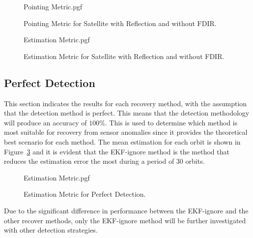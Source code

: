 \documentclass[letterpaper, 10 pt, conference]{ieeeconf}  %
\begin{document}
\begin{figure}[!htb]
	\begin{center}
	{Pointing Metric.pgf}
	\end{center}
	\caption[Pointing Metric for Satellite with Reflection and without FDIR]{Pointing Metric for Satellite with Reflection and without FDIR.}
	\label{fig:Pointing Accuracy Reflection}
\end{figure}

\begin{figure}[!htb]
	\begin{center}
	{Estimation Metric.pgf}
	\end{center}
	\caption[Estimation Metric for Satellite with Reflection and without FDIR]{Estimation Metric for Satellite with Reflection and without FDIR.}
	\label{fig:Estimation Accuracy Reflection}
\end{figure}

\subsection{Perfect Detection}
This section indicates the results for each recovery method, with the assumption that the detection method is perfect. This means that the detection methodology will produce an accuracy of $100\%$. This is used to determine which method is most suitable for recovery from sensor anomalies since it provides the theoretical best scenario for each method. The mean estimation for each orbit is shown in Figure~\ref{fig:Estimation Metric Summary} and it is evident that the EKF-ignore method is the method that reduces the estimation error the most during a period of $30$ orbits. 

\begin{figure}[!htb]
	\begin{center}
		{Estimation Metric.pgf}
	\end{center}
	\caption[Estimation Metric for Perfect Detection]{Estimation Metric for Perfect Detection.}
	\label{fig:Estimation Metric Summary}
\end{figure}

Due to the significant difference in performance between the EKF-ignore and the other recover methods, only the EKF-ignore method will be further investigated with other detection strategies.
\end{document}

